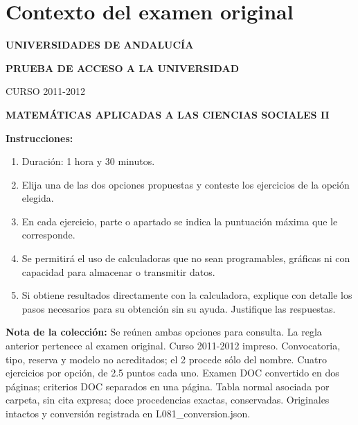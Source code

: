 \section*{Contexto del examen original}
\textbf{UNIVERSIDADES DE ANDALUCÍA}\par
\textbf{PRUEBA DE ACCESO A LA UNIVERSIDAD}\par
CURSO 2011-2012\par
\textbf{MATEMÁTICAS APLICADAS A LAS CIENCIAS SOCIALES II}

\textbf{Instrucciones:}
\begin{enumerate}[label=\textbf{\alph*)}]
  \item Duración: 1 hora y 30 minutos.
  \item Elija una de las dos opciones propuestas y conteste los ejercicios de la opción elegida.
  \item En cada ejercicio, parte o apartado se indica la puntuación máxima que le corresponde.
  \item Se permitirá el uso de calculadoras que no sean programables, gráficas ni con capacidad para almacenar o transmitir datos.
  \item Si obtiene resultados directamente con la calculadora, explique con detalle los pasos necesarios para su obtención sin su ayuda. Justifique las respuestas.
\end{enumerate}
\noindent\textbf{Nota de la colección:} Se reúnen ambas opciones para consulta. La regla anterior pertenece al examen original. Curso 2011-2012 impreso. Convocatoria, tipo, reserva y modelo no acreditados; el 2 procede sólo del nombre. Cuatro ejercicios por opción, de 2.5 puntos cada uno. Examen DOC convertido en dos páginas; criterios DOC separados en una página. Tabla normal asociada por carpeta, sin cita expresa; doce procedencias exactas, conservadas. Originales intactos y conversión registrada en L081\_conversion.json.
\par\medskip

